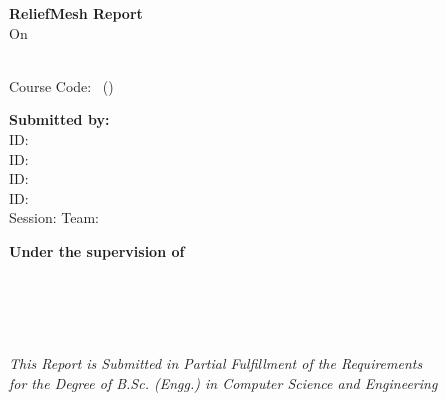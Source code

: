 
\begin{titlepage}
    \pagestyle{coverpage}
    \begin{center}
    
    {\LARGE\bfseries ReliefMesh Report\\[0.3cm]}
    \vspace{-6pt}
    \vspace{-6pt}
    {\large On\\[0.5cm]}
    \vspace{-6pt}
    \vspace{-6pt}
    
    {\Large\bfseries \reporttitle\\[0.4cm]}
    \vspace{-6pt}
    {\normalsize Course Code: \coursecode\ (\coursename)\\[1.0cm]}
    \vspace{-6pt}
    
    {\large\bfseries Submitted by:}\\[0.25cm]
    {\normalsize
    \studentonename\quad ID: \studentonereg\\
    \studenttwoname\quad ID: \studenttworeg\\
    \studentthreename\quad ID: \studentthreereg\\
    \studentfourname\quad ID: \studentfourreg\\[0.2cm]
    Session: \session\quad Team: \teamname\\[1.2cm]
    }
    \vspace{-6pt}
    
    {\large\bfseries Under the supervision of}\\[0.25cm]
    {\normalsize
    \supervisorname\\
    \supervisortitle\\
    \supervisordept\\
    \supervisoruni\\[1.9cm]
    }
    \vspace{-6pt}
    
    {\normalsize
    \textit{This Report is Submitted in Partial Fulfillment of the Requirements}\\
    \textit{for the Degree of B.Sc. (Engg.) in Computer Science and Engineering}\\[0.9cm]
    }
    

\end{center}
\end{titlepage}
